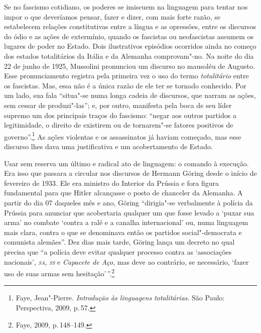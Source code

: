 Se no fascismo cotidiano, os poderes se imiscuem na linguagem para
tentar nos impor o que deveríamos pensar, fazer e dizer, com mais forte
razão, se estabelecem relações constitutivas entre a língua e as
opressões, entre os discursos do ódio e as ações de extermínio, quando
os fascistas ou neofascistas assumem os lugares de poder no Estado. Dois
ilustrativos episódios ocorridos ainda no começo dos estados
totalitários da Itália e da Alemanha comprovam"-no. Na noite do dia 22 de
junho de 1925, Mussolini pronunciou um discurso no mausoléu de Augusto.
Esse pronunciamento registra pela primeira vez o uso do termo
\emph{totalitário} entre os fascistas. Mas, essa não é a única razão de
ele ter se tornado conhecido. Por um lado, sua fala ``situa"-se numa
longa cadeia de discursos, que narram as ações, sem cessar de
produzi"-las''; e, por outro, manifesta pela boca de seu líder supremo um
dos principais traços do fascismo: ``negar aos outros partidos a
legitimidade, o direito de existirem ou de tornarem"-se fatores positivos
de governo''.\footnote{Faye, Jean"-Pierre. \emph{Introdução às linguagens
  totalitárias}. São Paulo: Perspectiva, 2009, p.\,57.} As ações
violentas e os assassinatos já haviam começado, mas esse discurso lhes
dava uma justificativa e um acobertamento de Estado.

Usar sem reserva um último e radical ato de linguagem: o comando à
execução. Era isso que passara a circular nos discursos de Hermann
Göring desde o início de fevereiro de 1933. Ele era ministro do Interior
da Prússia e fora figura fundamental para que Hitler alcançasse o posto
de chanceler da Alemanha. A partir do dia 07 daqueles mês e ano, Göring
``dirigia"-se verbalmente à polícia da Prússia para anunciar que
acobertaria qualquer um que fosse levado a `puxar sua arma' no combate
`contra a ralé e a canalha internacional' ou, numa linguagem mais clara,
contra o que se denominava então os partidos social"-democrata e
comunista alemães''. Dez dias mais tarde, Göring lança um decreto no
qual precisa que ``a polícia deve evitar qualquer processo contra as
`associações nacionais', \emph{\textsc{sa}}, \emph{\textsc{ss}} e \emph{Capacete de Aço},
mas deve ao contrário, se necessário, `fazer uso de suas armas sem
hesitação'\,''.\footnote{Faye, 2009, p.\,148--149.}

